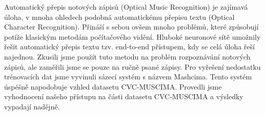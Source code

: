 \documentclass[12pt]{report}
\begin{document}

Automatický přepis notových zápisů (Optical Music Recognition) je zajímavá úloha, v mnoha ohledech podobná automatickému přepisu textu (Optical Character Recognition). Přináší s sebou ovšem mnoho problémů, které způsobují potíže klasickým metodám počítačového vidění. Hluboké neuronové sítě umožnily řešit automatický přepis textu tzv. end-to-end přístupem, kdy se celá úloha řeší najednou. Zkusili jsme použít tuto metodu na problém rozpoznávání notových zápisů, ale zaměřili jsme se pouze na ručně psané zápisy. Pro vyřešení nedostatku trénovacích dat jsme vyvinuli sázecí systém s názvem Mashcima. Tento systém úspěšně napodobuje vzhled datasetu CVC-MUSCIMA. Provedli jsme vyhodnocení našeho přístupu na části datasetu CVC-MUSCIMA a výsledky vypadají nadějně.
\end{document}
